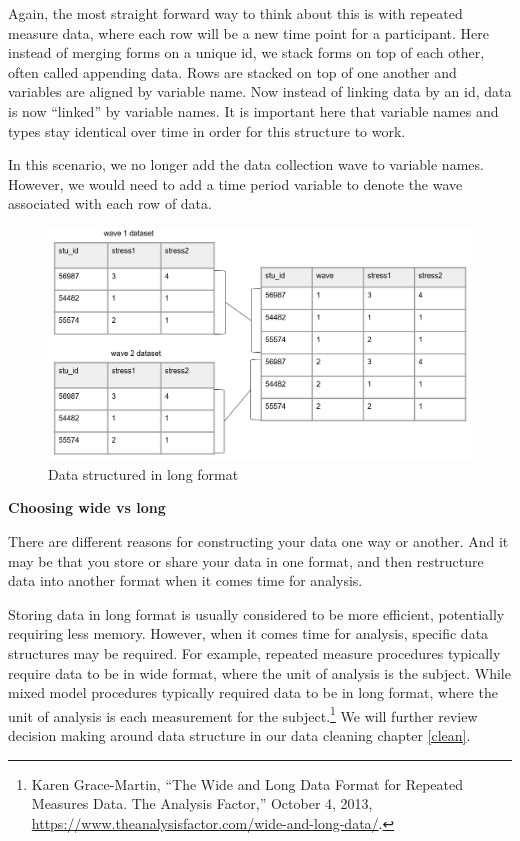 \documentclass[
]{book}
\begin{document}
Again, the most straight forward way to think about this is with repeated measure data, where each row will be a new time point for a participant. Here instead of merging forms on a unique id, we stack forms on top of each other, often called appending data. Rows are stacked on top of one another and variables are aligned by variable name. Now instead of linking data by an id, data is now ``linked'' by variable names. It is important here that variable names and types stay identical over time in order for this structure to work.

In this scenario, we no longer add the data collection wave to variable names. However, we would need to add a time period variable to denote the wave associated with each row of data.

\begin{figure}

{\centering \includegraphics[width=1\linewidth]{img/long} 

}

\caption{Data structured in long format}\label{fig:unnamed-chunk-13}
\end{figure}

\textbf{Choosing wide vs long}

There are different reasons for constructing your data one way or another. And it may be that you store or share your data in one format, and then restructure data into another format when it comes time for analysis.

Storing data in long format is usually considered to be more efficient, potentially requiring less memory. However, when it comes time for analysis, specific data structures may be required. For example, repeated measure procedures typically require data to be in wide format, where the unit of analysis is the subject. While mixed model procedures typically required data to be in long format, where the unit of analysis is each measurement for the subject.\footnote{Karen Grace-Martin, {``The Wide and Long Data Format for Repeated Measures Data. The Analysis Factor,''} October 4, 2013, \url{https://www.theanalysisfactor.com/wide-and-long-data/}.} We will further review decision making around data structure in our data cleaning chapter \ref{clean}.
\end{document}
